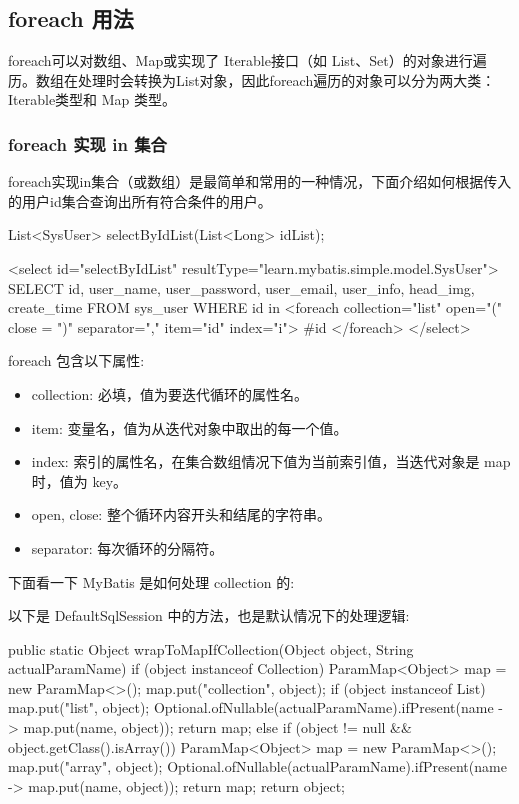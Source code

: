 \subsection{foreach 用法}

foreach可以对数组、Map或实现了 Iterable接口（如 List、Set）的对象进行遍历。数组在处理时会转换为List对象，因此foreach遍历的对象可以分为两大类：Iterable类型和 Map 类型。

\subsubsection*{foreach 实现 in 集合}

foreach实现in集合（或数组）是最简单和常用的一种情况，下面介绍如何根据传入的用户id集合查询出所有符合条件的用户。

\begin{Java}
List<SysUser> selectByIdList(List<Long> idList);
\end{Java}

\begin{xml}
<select id="selectByIdList" resultType="learn.mybatis.simple.model.SysUser">
    SELECT id, user_name, user_password, user_email, user_info, head_img, create_time
    FROM sys_user
    WHERE id in
    <foreach collection="list" open="(" close = ")" separator="," item="id" index="i">
        #{id}
    </foreach>
</select>
\end{xml}

foreach 包含以下属性:
\begin{itemize}
    \item collection: 必填，值为要迭代循环的属性名。
    \item item: 变量名，值为从迭代对象中取出的每一个值。
    \item index: 索引的属性名，在集合数组情况下值为当前索引值，当迭代对象是 map 时，值为 key。
    \item open, close: 整个循环内容开头和结尾的字符串。
    \item separator: 每次循环的分隔符。
\end{itemize}

下面看一下 MyBatis 是如何处理 collection 的:

以下是 DefaultSqlSession 中的方法，也是默认情况下的处理逻辑:

\begin{Java}
public static Object wrapToMapIfCollection(Object object, String actualParamName) {
    if (object instanceof Collection) {
        ParamMap<Object> map = new ParamMap<>();
        map.put("collection", object);
        if (object instanceof List) {
            map.put("list", object);
        }
        Optional.ofNullable(actualParamName).ifPresent(name -> map.put(name, object));
        return map;
    } else if (object != null && object.getClass().isArray()) {
        ParamMap<Object> map = new ParamMap<>();
        map.put("array", object);
        Optional.ofNullable(actualParamName).ifPresent(name -> map.put(name, object));
        return map;
    }
    return object;
}
\end{Java}

